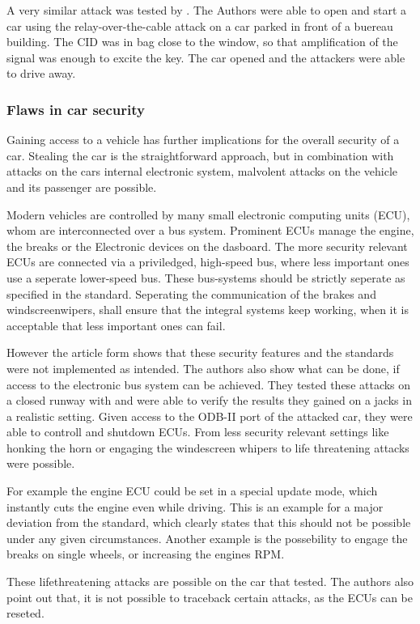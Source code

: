	A very similar attack was tested by \citeauthor{relayAttacksFranc}.
	The Authors were able to open and start a car using the relay-over-the-cable 
	attack on a car parked in front of a buereau building.
	The CID was in bag close to the window,
	so that amplification of the signal was enough to excite the key.
	The car opened and the attackers were able to drive away.

	\subsubsection*{Flaws in car security}
	Gaining access to a vehicle has further implications for the overall security of a car.
	Stealing the car is the straightforward approach,
	but in combination with attacks on the cars internal electronic system,
	malvolent attacks on the vehicle and its passenger are possible.

	Modern vehicles are controlled by many small electronic computing units (ECU),
	whom are interconnected over a bus system.
	Prominent ECUs manage the engine, the breaks or the Electronic devices on the dasboard.
	The more security relevant ECUs are connected via a priviledged,
	high-speed bus,
	where less important ones use a seperate lower-speed bus.
	These bus-systems should be strictly seperate as specified in the standard. %
	Seperating the communication of the brakes and windscreenwipers,
	shall ensure that the integral systems keep working,
	when it is acceptable that less important ones can fail.

	However the article form \citeauthor{expModernAuto}
	shows that these security features and the standards were not implemented as intended.
	The authors also show what can be done,
	if access to the electronic bus system can be achieved.
	They tested these attacks on a closed runway with
	and were able to verify the results they gained on a jacks in a realistic setting.
	Given access to the ODB-II port of the attacked car,
	they were able to controll and shutdown ECUs.
	From less security relevant settings like honking the horn or
	engaging the windescreen whipers to life threatening attacks were possible.

	For example the engine ECU could be set in a special update mode,
	which instantly cuts the engine even while driving.
	This is an example for a major deviation from the standard,
	which clearly states that this should not be possible under any given circumstances.
	Another example is the possebility to engage the breaks on single wheels,
	or increasing the engines RPM.

	These lifethreatening attacks are possible on the car that \citeauthor{expModernAuto} tested.
	The authors also point out that,
	it is not possible to traceback certain attacks,
	as the ECUs can be reseted.


